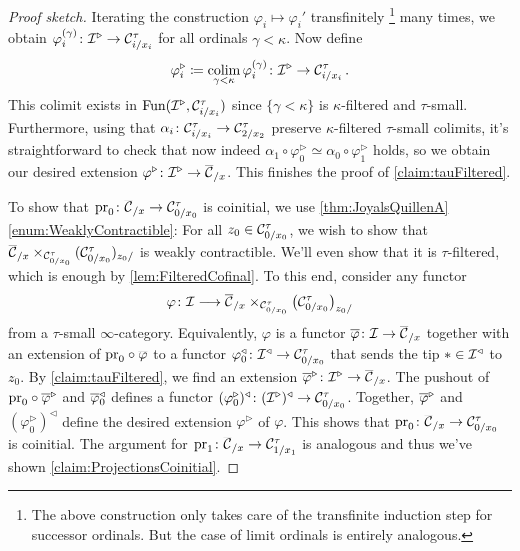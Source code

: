 \begin{proof}[Proof sketch]
	Iterating the construction $\varphi_i\mapsto \varphi_i'$ transfinitely%
	\footnote{The above construction only takes care of the transfinite induction step for successor ordinals. But the case of limit ordinals is entirely analogous.}
	many times, we obtain $\varphi_i^{(\gamma)}\colon \mathcal{I}^\triangleright\rightarrow \mathcal{C}_{i/x_i}^\tau$ for all ordinals $\gamma<\kappa$. Now define
	\begin{equation*}
		\varphi_i^\triangleright\coloneqq \operatorname*{colim}_{\gamma<\kappa}\varphi_i^{(\gamma)}\colon \mathcal{I}^\triangleright \rightarrow \mathcal{C}_{i/x_i}^\tau\,.
	\end{equation*}
	This colimit exists in $\operatorname{Fun}(\mathcal{I}^\triangleright,\mathcal{C}_{i/x_i}^\tau)$ since $\{\gamma<\kappa\}$ is $\kappa$-filtered and $\tau$-small. Furthermore, using that $\alpha_i\colon \mathcal{C}_{i/x_i}^\tau\rightarrow \mathcal{C}_{2/x_2}^\tau$ preserve $\kappa$-filtered $\tau$-small colimits, it's straightforward to check that now indeed $\alpha_1\circ\varphi_0^\triangleright\simeq \alpha_0\circ\varphi_1^\triangleright$ holds, so we obtain our desired extension $\varphi^\triangleright\colon \Ii^\triangleright\rightarrow \ov\Cc_{/x}$. This finishes the proof of \cref{claim:tauFiltered}.
	
	To show that $\pr_0\colon \ov\Cc_{/x}\rightarrow \Cc_{0/x_0}^\tau$ is coinitial, we use \cref{thm:JoyalsQuillenA}\cref{enum:WeaklyContractible}: For all $z_0\in\mathcal{C}_{0/x_0}^\tau$, we wish to show that $\ov\Cc_{/x}\times_{\Cc_{0/x_0}^\tau}(\Cc_{0/x_0}^\tau)_{z_0/}$ is weakly contractible. We'll even show that it is $\tau$-filtered, which is enough by \cref{lem:FilteredCofinal}. To this end, consider any functor
	\begin{equation*}
		\varphi\colon \Ii\longrightarrow \ov\Cc_{/x}\times_{\Cc_{0/x_0}^\tau}\bigl(\Cc_{0/x_0}^\tau\bigr)_{z_0/}
	\end{equation*}
	from a $\tau$-small $\infty$-category. Equivalently, $\varphi$ is a functor $\ov\varphi\colon \Ii\rightarrow \ov\Cc_{/x}$ together with an extension of ${\pr_0}\circ \ov\varphi$ to a functor $\varphi_0^\triangleleft\colon \mathcal{I}^\triangleleft\rightarrow \mathcal{C}_{0/x_0}^\tau$ that sends the tip $*\in \mathcal{I}^\triangleleft$ to $z_0$. By \cref{claim:tauFiltered}, we find an extension $\ov\varphi^\triangleright \colon \Ii^\triangleright\rightarrow \ov\Cc_{/x}$. The pushout of ${\pr_0}\circ\ov\varphi^\triangleright$ and $\ov\varphi_0^\triangleleft$ defines a functor $(\varphi_0^\triangleright)^\triangleleft\colon (\mathcal{I}^\triangleright)^\triangleleft \rightarrow \mathcal{C}_{0/x_0}^\tau$. Together, $\ov\varphi^\triangleright$ and $(\varphi_0^\triangleright)^\triangleleft$ define the desired extension $\varphi^\triangleright$ of $\varphi$. This shows that $\pr_0\colon \ov\Cc_{/x}\rightarrow \Cc_{0/x_0}^\tau$ is coinitial. The argument for $\pr_1\colon \ov\Cc_{/x}\rightarrow \Cc_{1/x_1}^\tau$ is analogous and thus we've shown \cref{claim:ProjectionsCoinitial}.
\end{proof}
